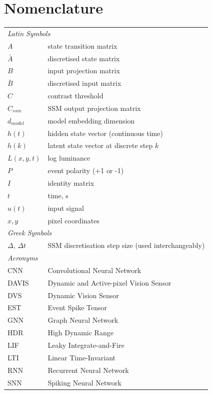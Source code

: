 \documentclass[11pt, a4paper]{report}
\begin{document}
\tableofcontents

\chapter*{Nomenclature}
\begin{tabular}{ll}
\multicolumn{2}{l}{\textit{Latin Symbols}} \\[4pt]
$A$ & state transition matrix \\
$\bar{A}$ & discretised state matrix \\
$B$ & input projection matrix \\
$\bar{B}$ & discretised input matrix \\
$C$ & contrast threshold \\
$C_{ssm}$ & SSM output projection matrix \\
$d_{model}$ & model embedding dimension \\
$h(t)$ & hidden state vector (continuous time) \\
$h(k)$ & latent state vector at discrete step $k$ \\
$L(x,y,t)$ & log luminance \\
$P$ & event polarity (+1 or -1) \\
$I$ & identity matrix \\
$t$ & time, s \\
$u(t)$ & input signal \\
$x, y$ & pixel coordinates \\[8pt]
\multicolumn{2}{l}{\textit{Greek Symbols}} \\[4pt]
$\Delta$, $\Delta t$ & SSM discretisation step size (used interchangeably) \\[8pt]
\multicolumn{2}{l}{\textit{Acronyms}} \\[4pt]
CNN & Convolutional Neural Network \\
DAVIS & Dynamic and Active-pixel Vision Sensor \\
DVS & Dynamic Vision Sensor \\
EST & Event Spike Tensor \\
GNN & Graph Neural Network \\
HDR & High Dynamic Range \\
LIF & Leaky Integrate-and-Fire \\
LTI & Linear Time-Invariant \\
RNN & Recurrent Neural Network \\
SNN & Spiking Neural Network \\

\end{tabular}
\end{document}
